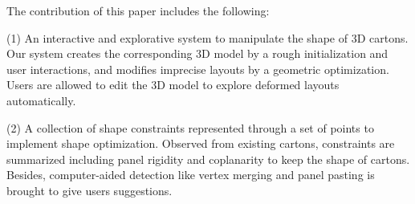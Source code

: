 The contribution of this paper includes the following:

(1) An interactive and explorative system to manipulate the shape of 3D cartons. Our system creates the corresponding 3D model by a rough initialization and user interactions, and modifies imprecise layouts by a geometric optimization. Users are allowed to edit the 3D model to explore deformed layouts automatically.

(2) A collection of shape constraints represented through a set of points to implement shape optimization. Observed from existing cartons, constraints are summarized including panel rigidity and coplanarity to keep the shape of cartons. Besides, computer-aided detection like vertex merging and panel pasting is brought to give users suggestions. 